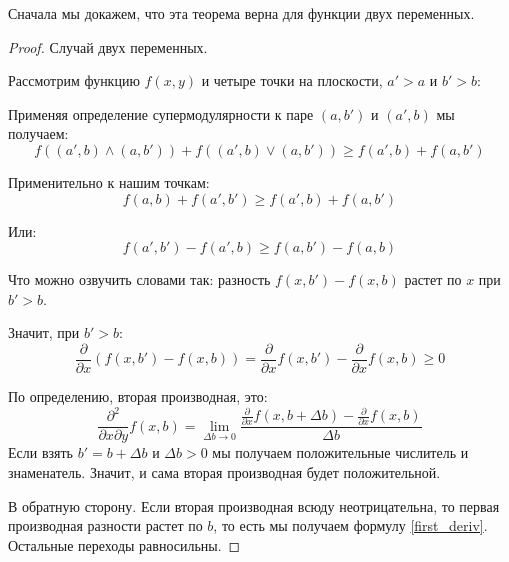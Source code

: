 Сначала мы докажем, что эта теорема верна для функции двух переменных.
\begin{proof} Случай двух переменных.

Рассмотрим функцию $ f(x,y) $ и четыре точки на плоскости, $ a'>a $ и $ b'>b $:



Применяя определение супермодулярности к паре $ (a,b') $ и $ (a',b) $ мы получаем:
\begin{equation}
f((a',b)\wedge(a,b')) + f((a',b)\vee(a,b'))\geq f(a',b) + f(a,b')
\end{equation}

Применительно к нашим точкам:
\begin{equation}
f(a,b)+f(a',b')\geq f(a',b)+f(a,b')
\end{equation}

Или:
\begin{equation}
f(a',b')-f(a',b)\geq f(a,b')-f(a,b)
\end{equation}

Что можно озвучить словами так: разность $ f(x,b')-f(x,b) $ растет по $ x $ при $ b'>b $.


Значит, при $ b'>b $:
\begin{equation}\label{first_deriv}
\frac{\partial }{\partial x}(f(x,b')-f(x,b))=\frac{\partial }{\partial x}f(x,b')-\frac{\partial }{\partial x} f(x,b) \geq 0
\end{equation}

По определению, вторая производная, это:
\begin{equation}
\frac{\partial^{2}}{\partial x \partial y}f(x,b)=\lim_{\Delta b\to 0}\frac{\frac{\partial }{\partial x}f(x,b+\Delta b)-\frac{\partial }{\partial x} f(x,b)}{\Delta b}
\end{equation}
Если взять $ b'=b+\Delta b $ и $ \Delta b>0 $ мы получаем положительные числитель и знаменатель. Значит, и сама вторая производная будет положительной.

В обратную сторону. Если вторая производная всюду неотрицательна, то первая производная разности растет по $ b $, то есть мы получаем формулу \ref{first_deriv}. Остальные переходы равносильны.

\end{proof}


